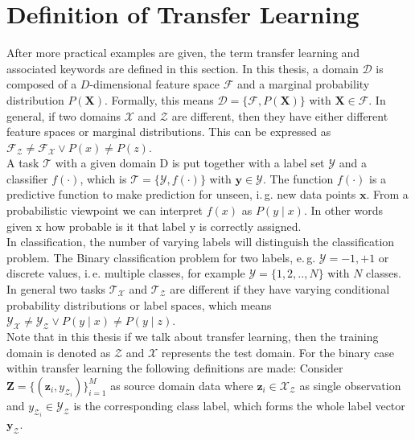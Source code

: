 \section{Definition of Transfer Learning}\label{TlSecDef}
After more practical examples are given, the term transfer learning and associated keywords are defined in this section.\newline
In this thesis, a domain $\mathcal{D}$ is composed of a $D$-dimensional feature space $\mathcal{F}$ and a marginal probability distribution $P(\mathbf{X})$.
Formally, this means $\mathcal{D} = \{\mathcal{F},P(\mathbf{X})\}$ with $\mathbf{X} \in \mathcal{F}$.
In general, if two domains $\mathcal{X}$ and $\mathcal{Z}$ are different, then they have either different feature spaces or marginal distributions.
This can be expressed as $\mathcal{F_{Z}} \neq \mathcal{F_{X}} \vee P(x) \neq \textit{P}(z)$.\cite[. 542]{Aggarwal.2015}\\
A task $\mathcal{T}$ with a given domain D is put together with a label set $\mathcal{Y}$ and a classifier $f(\cdot)$, which is  $\mathcal{T} = \{\mathcal{Y},\textit{f}(\cdot)\}$ with $\mathbf{y} \in \mathcal{Y}$.
The function $f(\cdot)$ is a predictive function to make prediction for unseen, i.\,g. new data points $\mathbf{x}$.
From a probabilistic viewpoint we can interpret $f(x)$ as $P(y\mid x)$.
In other words given x how probable is it that label y is correctly assigned.\\
In classification, the number of varying labels will distinguish the classification problem.
The Binary classification problem for two labels, e.\,g. $\mathcal{Y} ={-1,+1}$ or discrete values, i.\,e. multiple classes, for example $\mathcal{Y}= \{1,2,..,N\}$ with $N$ classes.
In general two tasks $\mathcal{T_X}$ and $\mathcal{T_{Z}}$ are different if they have varying conditional probability distributions or label spaces, which means $\mathcal{Y_{X}} \neq \mathcal{Y_{Z}} \vee P(y\mid x) \neq P(y\mid z)$.\cite[p. 542]{Aggarwal.2015}\\ 
Note that in this thesis if we talk about transfer learning, then the training domain is denoted as $\mathcal{Z}$ and $\mathcal{X}$ represents the test domain.
For the binary case within transfer learning the following definitions are made:
Consider $\mathbf{Z} = \{(\mathbf{z}_i,y_{\mathcal{Z}_i})\}_{i=1}^{M}$ as source domain data where $\mathbf{z}_i \in \mathcal{X}_\mathcal{Z}$ as single observation and $y_{\mathcal{Z}_i} \in \mathcal{Y}_\mathcal{Z}$ is the corresponding class label, which forms the whole label vector $\mathbf{y}_\mathcal{Z}$.
